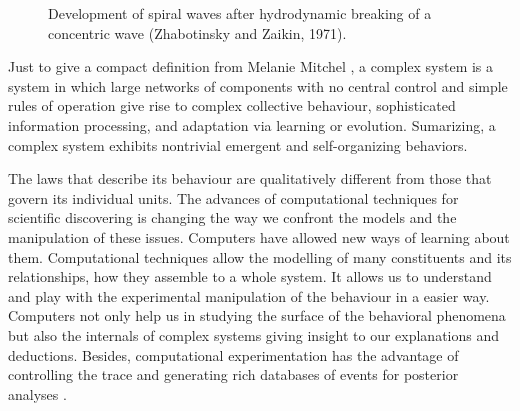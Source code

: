 \documentclass[11pt,oneside,a4paper,openright]{report}
\begin{document}
\begin{figure}[h]
\centering
\setlength\fboxsep{0pt}
\setlength\fboxrule{0.5pt}
\caption{ Development of spiral waves after hydrodynamic breaking of a concentric wave (Zhabotinsky and Zaikin, 1971).}
\label{fig:ZhaboZaikin_1}
\end{figure}





Just to give a compact definition from Melanie Mitchel \cite{MelanieMitchell2009}, a complex system is a system in
which large networks of components with no central control and simple rules of operation give rise to complex collective behaviour, sophisticated information processing, and adaptation via learning or evolution. Sumarizing, a complex system exhibits nontrivial emergent and self-organizing behaviors.

The laws that describe its behaviour are qualitatively different from those that govern its individual units.
The advances of computational techniques for scientific discovering is changing the way we confront the models 
and the manipulation of these issues. Computers have allowed new ways of learning about them. Computational techniques 
allow the modelling of many constituents and its relationships, how they assemble to a whole system. It allows us 
to understand and play with the experimental manipulation of the behaviour in a easier way. Computers not only help 
us in studying the surface of the behavioral phenomena but also the internals of complex systems giving insight 
to our explanations and deductions. Besides, computational experimentation has the advantage of controlling the trace 
and generating rich databases of events for posterior analyses \cite{Vicsek2002}.
\end{document}
